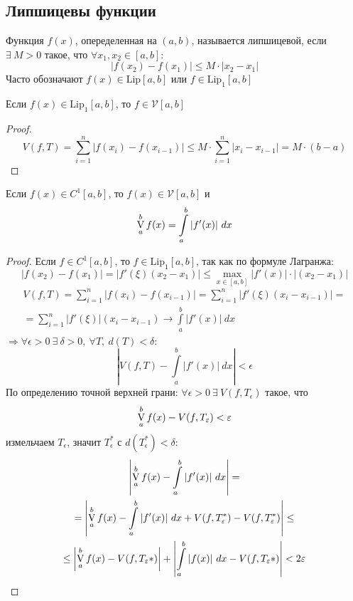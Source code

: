 \subsection{Липшицевы функции}
\begin{definition}
Функция $f(x)$, опеределенная на $(a,b)$, называется липшицевой, если $\exists\ M>0$ такое, что $\forall x_1,x_2\in [a,b]:$
\[|f(x_2)-f(x_1)|\leq M\cdot |x_2-x_1|\]
Часто обозначают $f(x)\in \text{Lip}[a,b]$ или $f\in \text{Lip}_1[a,b]$
\end{definition} 
\begin{theorem}
    Если $f(x)\in \text{Lip}_1[a,b]$, то $f\in \mathcal{V}[a,b]$
\end{theorem} 
\begin{proof}
    \[V(f,T)=\sum\limits_{i=1}^{n}|f(x_i)-f(x_{i-1})|\leq M\cdot\sum\limits_{i=1}^{n}|x_i-x_{i-1}|=M\cdot (b-a)\]
\end{proof} 
\begin{theorem}
    Если $f(x)\in C^1[a,b]$, то $f(x)\in \mathcal{V}[a,b]$ и 
    \[\operatorname*{V}\limits_{a}^{b} f(x)=\int\limits_{a}^{b}|f'(x)|\ dx\]
\end{theorem} 
\begin{proof}
    Если $f\in C^1[a,b]$, то $f\in \text{Lip}_1[a,b]$, так как по формуле Лагранжа:
    \[|f(x_2)-f(x_1)|=|f'(\xi)(x_2-x_1)|\leq \max\limits_{x\in [a,b]}|f'(x)|\cdot|(x_2-x_1)|\]
    \begin{multline*}
        V(f, T)=\sum\limits_{i=1}^{n}|f(x_i)-f(x_{i-1})|=\sum\limits_{i=1}^{n} |f'(\xi)(x_i-x_{i-1})|=\\
        =\sum\limits_{i=1}^{n} |f'(\xi)| (x_i-x_{i-1})\to \int\limits_{a}^{b}|f'(x)|\ dx
    \end{multline*}
    $\Rightarrow \forall \epsilon>0\ \exists\ \delta>0,\ \forall T,\ d(T)<\delta$:
    \[\left|V(f,T)-\int\limits_{a}^{b}|f'(x)|\ dx\right|<\epsilon\]
    По определению точной верхней грани: $\forall \epsilon>0\ \exists\ V(f,T_{\epsilon})$ такое, что
    \[\operatorname*{V}\limits_{a}^{b} f(x)-V(f,T_{\varepsilon})<\varepsilon\]
    измельчаем $T_{\epsilon}$, значит $T_{\epsilon}^*$ с $d(T_{\epsilon}^*)<\delta$:
    \begin{multline*}
        \left| \variation\limits_{a}^{b} f(x)-\int\limits_{a}^{b}|f'(x)|\ dx \right|=\\=\left|\variation\limits_{a}^{b} f(x)-\int\limits_{a}^{b}|f'(x)|\ dx+V(f,T_{\epsilon}^*)-V(f, T_{\epsilon}^*)\right|\leq\\
        \leq \left|\variation\limits_{a}^{b} f(x)-V(f, T_{\epsilon}*)\right|+\left|\int\limits_{a}^{b}|f(x)|\ dx-V(f,T_{\epsilon}*)\right|<2\epsilon
    \end{multline*}
\end{proof}
